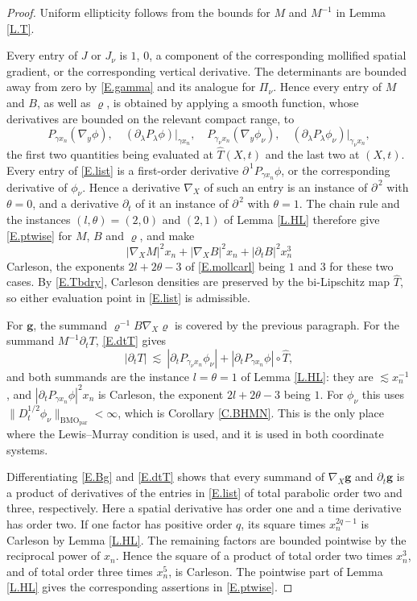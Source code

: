 \documentclass[10pt,a4paper]{amsart}
\numberwithin{equation}{section}
\newcommand{\abs}[1]{\left\vert#1\right\vert}
\newcommand{\br}[1]{\left(#1\right)}
\newcommand{\pd}{\partial}
\newcommand{\dhalf}{D_t^{1/2}}
\newcommand{\BMOpar}{\mathrm{BMO}_{\mathrm{par}}}
\begin{document}
\begin{proof}
Uniform ellipticity follows from the bounds for $M$ and $M^{-1}$ in
Lemma \ref{L.T}.

Every entry of $J$ or $J_\nu$ is $1$, $0$, a component of the corresponding
mollified spatial gradient, or the corresponding vertical derivative. The
determinants are bounded away from zero by \eqref{E.gamma} and its analogue
for $\Pi_\nu$. Hence every entry
of $M$ and $B$, as well as $\varrho$, is obtained by applying a smooth
function, whose derivatives are bounded on the relevant compact range, to
\begin{equation}\label{E.list}
  P_{\gamma x_n}\br{\nabla_y\phi},\quad
  \br{\pd_\lambda P_\lambda\phi}\big|_{\gamma x_n},\quad
  P_{\gamma_\nu x_n}\br{\nabla_y\phi_\nu},\quad
  \br{\pd_\lambda P_\lambda\phi_\nu}\big|_{\gamma_\nu x_n} ,
\end{equation}
the first two quantities being evaluated at $\widehat T(X,t)$ and the last two
at $(X,t)$. Every entry of \eqref{E.list} is a first-order derivative
$\pd^{\,1}P_{\gamma x_n}\phi$, or the corresponding derivative of
$\phi_\nu$. Hence a derivative $\nabla_X$ of such an entry is an
instance of $\pd^{\,2}$ with $\theta=0$, and a derivative $\pd_t$ of it an
instance of $\pd^{\,2}$ with $\theta=1$. The chain rule and the instances
$(l,\theta)=(2,0)$ and $(2,1)$ of Lemma \ref{L.HL} therefore give
\eqref{E.ptwise} for $M$, $B$ and $\varrho$, and make
$$\abs{\nabla_XM}^2x_n+\abs{\nabla_XB}^2x_n
  +\abs{\pd_tB}^2x_n^3$$
Carleson, the exponents $2l+2\theta-3$ of \eqref{E.mollcarl} being $1$ and $3$
for these two cases. By \eqref{E.Tbdry}, Carleson densities are preserved by
the bi-Lipschitz map $\widehat T$, so either evaluation point in
\eqref{E.list} is admissible.\medskip

For $\mathbf g$, the summand $\varrho^{-1}B\nabla_X\varrho$ is covered by the
previous paragraph. For the summand $M^{-1}\pd_tT$, \eqref{E.dtT} gives
$$\abs{\pd_tT}\ \lesssim\ \abs{\pd_tP_{\gamma_\nu x_n}\phi_\nu}
  +\abs{\pd_tP_{\gamma x_n}\phi}\circ\widehat T ,$$
and both summands are the instance $l=\theta=1$ of Lemma \ref{L.HL}: they are
$\lesssim x_n^{-1}$, and $\abs{\pd_tP_{\gamma x_n}\phi}^2x_n$ is Carleson, the
exponent $2l+2\theta-3$ being $1$. For $\phi_\nu$ this uses
$\|\dhalf\phi_\nu\|_{\BMOpar}<\infty$, which is Corollary \ref{C.BHMN}. This is
the only place where the Lewis--Murray condition is used, and it is used in both
coordinate systems.\medskip

Differentiating \eqref{E.Bg} and \eqref{E.dtT} shows that every summand of
$\nabla_X\mathbf g$ and $\pd_t\mathbf g$ is a product of derivatives of the
entries in \eqref{E.list} of total parabolic order two and three,
respectively. Here a spatial derivative has order one and a time derivative
has order two. If one factor has positive order $q$, its square times
$x_n^{2q-1}$ is Carleson by Lemma \ref{L.HL}. The remaining factors are
bounded pointwise by the reciprocal power of $x_n$. Hence the square of a
product of total order two times $x_n^3$, and of total order three times
$x_n^5$, is Carleson. The pointwise part of Lemma \ref{L.HL} gives the
corresponding assertions in \eqref{E.ptwise}.


\end{proof}
\end{document}
